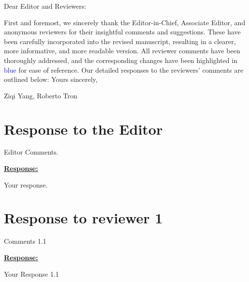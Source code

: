 \documentclass{article}
\newcommand{\new}[1]{\textcolor{blue}{#1}}
\begin{document}
	




\noindent
Dear Editor and Reviewers:

\vspace{0.2cm}
\noindent
First and foremost, we sincerely thank the Editor-in-Chief, Associate Editor, and anonymous reviewers for their insightful comments and suggestions. These have been carefully incorporated into the revised manuscript, resulting in a clearer, more informative, and more readable version. All reviewer comments have been thoroughly addressed, and the corresponding changes have been highlighted in \new{blue} for ease of reference. Our detailed responses to the reviewers' comments are outlined below:
\vspace{0.2cm}
\noindent
Yours sincerely,

\noindent
Ziqi Yang, Roberto Tron


\section*{Response to the Editor} 
\begin{cmt*}{}{}
Editor Comments.
\end{cmt*}

\vspace{0.1cm}
\noindent
\underline{\textbf{Response:}}
\vspace{0.2cm}

Your response. 




\newpage
\section{Response to reviewer 1} 

\begin{cmt}{}{}

Comments 1.1

\end{cmt}
\vspace{0.1cm}
\noindent
\underline{\textbf{Response:}}
\vspace{0.2cm}

Your Response 1.1
\end{document}
